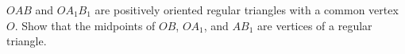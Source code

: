 $OAB$ and $OA_1B_1$ are positively oriented regular triangles with a common vertex $O$. Show that the midpoints of $OB$, $OA_1$, and $AB_1$ are vertices of a regular triangle.
